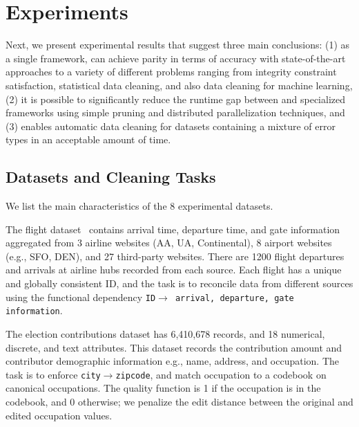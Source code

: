 \section{Experiments}\label{s:exp}
Next, we present experimental results that suggest three main conclusions: (1) as a single framework, \sys can achieve parity in terms of accuracy with state-of-the-art approaches to a variety of different problems ranging from integrity constraint satisfaction, statistical data cleaning, and also data cleaning for machine learning, (2) it is possible to significantly reduce the runtime gap between \sys and specialized frameworks using simple pruning and distributed parallelization techniques, and (3) \sys enables automatic data cleaning for datasets containing a mixture of error types in an acceptable amount of time.  

\subsection{Datasets and Cleaning Tasks}
We list the main characteristics of the 8 experimental datasets.

 The flight dataset~\cite{data-flights} contains arrival time, departure time, and gate information aggregated from 3 airline websites (AA, UA, Continental), 8 airport websites (e.g., SFO, DEN), and 27 third-party websites.
There are 1200 flight departures and arrivals at airline hubs recorded from each source.  Each flight has a unique and globally consistent ID, and the task is to reconcile data from different sources using the functional dependency \texttt{ID$\rightarrow$ arrival, departure, gate information}.


 The election contributions dataset has 6,410,678 records, and 18 numerical, discrete, and text attributes. This dataset records the contribution amount and contributor demographic information e.g., name, address, and occupation.  The task is to enforce \texttt{city$\rightarrow$zipcode}, and match occupation to a codebook on canonical occupations.  The quality function is 1 if the occupation is in the codebook, and 0 otherwise; we penalize the edit distance between the original and edited occupation values.

